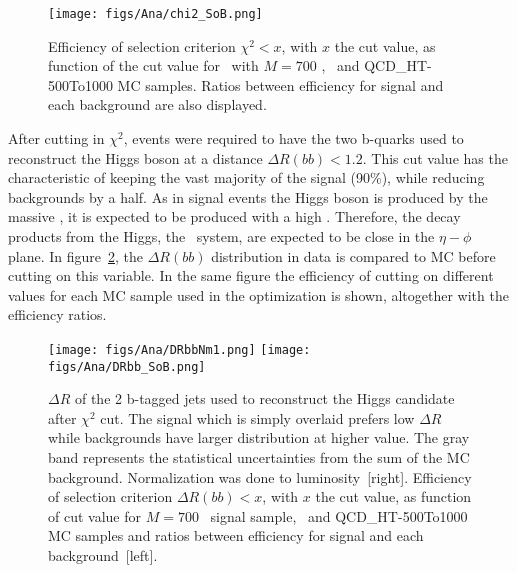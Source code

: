 \begin{figure}[!Hhtbp]
  \begin{center}
    \texttt{[image: figs/Ana/chi2\_SoB.png]}
    \caption{Efficiency of selection criterion $\chi^{2}<x$, with $x$ the cut value, as function of the cut value for \Tp~with $M=700$ \GeVcc, \ttbar~and QCD\_HT-500To1000 MC samples. Ratios between efficiency for signal and each background are also displayed.}
    \label{fig:chi2cut}
  \end{center}
\end{figure}

After cutting in $\chi^{2}$, events were required to have the two b-quarks used to reconstruct the Higgs boson at a distance $\Delta R(bb)<1.2$. This cut value has the characteristic of keeping the vast majority of the signal (90\%), while reducing backgrounds by a half. As in signal events the Higgs boson is produced by the massive \Tp, it is expected to be produced with a high \pt. Therefore, the decay products from the Higgs, the \bbbar~system, are expected to be close in the $\eta-\phi$ plane. In figure~\ref{fig:DRbb}, the $\Delta R(bb)$ distribution in data is compared to MC before cutting on this variable. In the same figure the efficiency of cutting on different values for each MC sample used in the optimization is shown, altogether with the efficiency ratios. %

\begin{figure}[!Hhtbp]
  \begin{center}
    \texttt{[image: figs/Ana/DRbbNm1.png]}
    \texttt{[image: figs/Ana/DRbb\_SoB.png]}
    \caption{$\Delta R$ of the 2 b-tagged jets used to reconstruct the Higgs candidate after $\chi^{2}$ cut. The signal which is simply overlaid prefers low $\Delta R$ while backgrounds have larger distribution at higher value. The gray band represents the statistical uncertainties from the sum of the MC background. Normalization was done to luminosity~[right]. Efficiency of selection criterion $\Delta R(bb)<x$, with $x$ the cut value, as function of cut value for $M=700$ \GeVcc~signal sample, \ttbar~and QCD\_HT-500To1000 MC samples and ratios between efficiency for signal and each background~[left].}
    \label{fig:DRbb}
  \end{center}
\end{figure}

